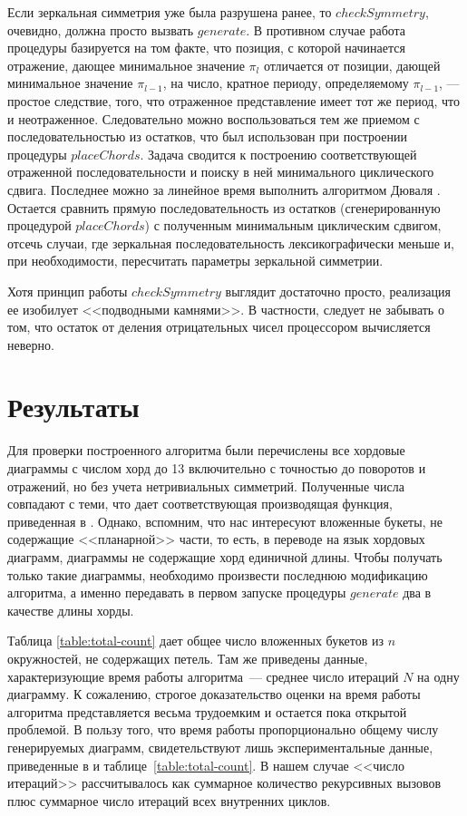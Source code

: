 \documentclass[a4paper,12pt]{article}
\theoremstyle{plain}
\theoremstyle{definition}
\begin{document}
Если зеркальная симметрия уже была разрушена ранее, то $checkSymmetry$, очевидно, должна просто вызвать $generate$. В противном
случае работа процедуры базируется на том факте, что позиция, с которой начинается отражение, дающее минимальное значение
$\pi_l$ отличается от позиции, дающей минимальное значение $\pi_{l - 1}$, на число, кратное периоду, определяемому $\pi_{l -
1}$, --- простое следствие, того, что отраженное представление имеет тот же период, что и неотраженное. Следовательно можно
воспользоваться тем же приемом с последовательностью из остатков, что был использован при построении процедуры $placeChords$.
Задача сводится к построению соответствующей отраженной последовательности и поиску в ней минимального циклического сдвига.
Последнее можно за линейное время выполнить алгоритмом Дюваля \cite{Duval1983}. Остается сравнить прямую последовательность из
остатков (сгенерированную процедурой $placeChords$) с полученным минимальным циклическим сдвигом, отсечь случаи, где зеркальная
последовательность лексикографически меньше и, при необходимости, пересчитать параметры зеркальной симметрии.

Хотя принцип работы $checkSymmetry$ выглядит достаточно просто, реализация ее изобилует <<подводными камнями>>. В частности,
следует не забывать о том, что остаток от деления отрицательных чисел процессором вычисляется неверно.

\section{Результаты}

Для проверки построенного алгоритма были перечислены все хордовые диаграммы с числом хорд до 13 включительно с точностью до
поворотов и отражений, но без учета нетривиальных симметрий. Полученные числа совпадают с теми, что дает соответствующая
производящая функция, приведенная в \cite{Liskovets2000}. Однако, вспомним, что нас интересуют вложенные букеты, не содержащие
<<планарной>> части, то есть, в переводе на язык хордовых диаграмм, диаграммы не содержащие хорд единичной длины. Чтобы
получать только такие диаграммы, необходимо произвести последнюю модификацию алгоритма, а именно передавать в первом запуске
процедуры $generate$ два в качестве длины хорды.

Таблица \ref{table:total-count} дает общее число вложенных букетов из $n$ окружностей, не содержащих петель. Там же приведены
данные, характеризующие время работы алгоритма~--- среднее число итераций $N$ на одну диаграмму. К сожалению, строгое
доказательство оценки на время работы алгоритма представляется весьма трудоемким и остается пока открытой проблемой. В пользу
того, что время работы пропорционально общему числу генерируемых диаграмм, свидетельствуют лишь экспериментальные данные,
приведенные в \cite{Sawada2002} и таблице~\ref{table:total-count}. В нашем случае <<число итераций>> рассчитывалось как суммарное
количество рекурсивных вызовов плюс суммарное число итераций всех внутренних циклов.
\end{document}
